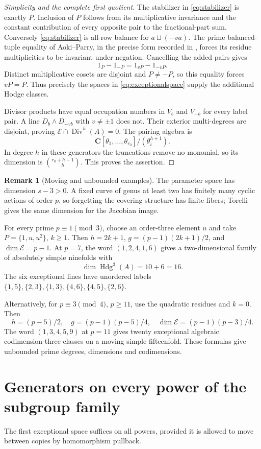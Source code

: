 \documentclass[11pt]{article}
\theoremstyle{definition}
\newtheorem{remark}[theorem]{Remark}
\newcommand{\C}{\mathbf C}
\newcommand{\Hdg}{\operatorname{Hdg}}
\newcommand{\Div}{\operatorname{Div}}
\begin{document}
\begin{proof}[Simplicity and the complete first quotient]
The stabilizer in \eqref{eq:stabilizer} is exactly $P$. Inclusion of $P$
follows from its multiplicative invariance and the constant contribution
of every opposite pair to the fractional-part sum. Conversely
\eqref{eq:stabilizer} is all-row balance for $a\sqcup(-va)$.
The prime balanced-tuple equality of Aoki--Parry, in the precise form
recorded in \cite[Section 3]{Fusion}, forces its residue multiplicities
to be invariant under negation. Cancelling the added pairs gives
\[
                 1_P-1_{-P}=1_{vP}-1_{-vP}.
\]
Distinct multiplicative cosets are disjoint and $P\ne-P$, so this
equality forces $vP=P$. Thus precisely the spaces in
\eqref{eq:exceptionalspace} supply the additional Hodge classes.

Divisor products have equal occupation numbers in $V_b$ and $V_{-b}$
for every label pair. A line $D_b\wedge D_{-vb}$ with $v\ne\pm1$
does not. Their exterior multi-degrees are disjoint, proving
$\mathscr E\cap\Div^h(A)=0$. The pairing algebra is
\[
 \C[\theta_1,\ldots,\theta_{r_0}]/(\theta_i^{h+1}).
\]
In degree $h$ in these generators the truncations remove no monomial,
so its dimension is $\binom{r_0+h-1}{h}$. This proves the assertion.
\end{proof}

\begin{remark}[Moving and unbounded examples]
The parameter space has dimension $s-3>0$. A fixed curve of genus at
least two has finitely many cyclic actions of order $p$, so forgetting
the covering structure has finite fibers; Torelli gives the same dimension
for the Jacobian image.

For every prime $p\equiv1\pmod3$, choose an order-three element $u$ and
take $P=\{1,u,u^2\}$, $k\ge1$. Then $h=2k+1$,
$g=(p-1)(2k+1)/2$, and $\dim\mathscr E=p-1$.
At $p=7$, the word $(1,2,4,1,6)$ gives a two-dimensional family of
absolutely simple ninefolds with
\[
                 \dim\Hdg^3(A)=10+6=16.
\]
The six exceptional lines have unordered labels
$\{1,5\},\{2,3\},\{1,3\},\{4,6\},\{4,5\},\{2,6\}$.

Alternatively, for $p\equiv3\pmod4$, $p\ge11$, use the quadratic
residues and $k=0$. Then
\[
 h=(p-5)/2,\quad g=(p-1)(p-5)/4,\quad
 \dim\mathscr E=(p-1)(p-3)/4.
\]
The word $(1,3,4,5,9)$ at $p=11$ gives twenty exceptional algebraic
codimension-three classes on a moving simple fifteenfold. These formulas
give unbounded prime degrees, dimensions and codimensions.
\end{remark}

\section{Generators on every power of the subgroup family}\label{sec:ring}
The first exceptional space suffices on all powers, provided it is allowed
to move between copies by homomorphism pullback.
\end{document}
